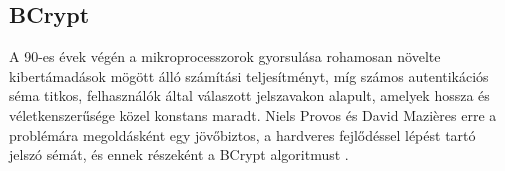 \subsection{BCrypt}

A 90-es évek végén a mikroprocesszorok gyorsulása rohamosan növelte kibertámadások mögött álló számítási teljesítményt, míg számos autentikációs séma titkos, felhasználók által válaszott jelszavakon alapult, amelyek hossza és véletkenszerűsége közel konstans maradt. Niels Provos és David Mazières erre a problémára megoldásként egy jövőbiztos, a hardveres fejlődéssel lépést tartó jelszó sémát, és ennek részeként a BCrypt algoritmust \cite{provos1999future}. \par